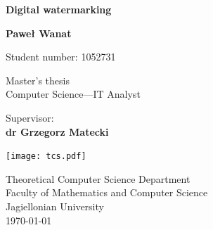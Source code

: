 \documentclass[a4paper,12pt]{article}
\title{}
\author{}
\begin{document}
\begin{titlepage}
    \begin{center}
        \vspace*{1cm}
        
        \Huge
        \textbf{Digital watermarking}
        
        \vspace{0.5cm}
        \LARGE
        
        \vspace{1.5cm}
        
        \textbf{Paweł Wanat}
        
        \vspace{0.10cm}
        
        \large
        Student number: 1052731
        
        \vfill
        
        \large
        
        Master's thesis \\
        Computer Science---IT Analyst
        
        \vfill	
        
        Supervisor: \\
        \textbf{dr Grzegorz Matecki}
        
        \vspace{0.8cm}
        
        \texttt{[image: tcs.pdf]}
        
        Theoretical Computer Science Department\\
        Faculty of Mathematics and Computer Science\\
        Jagiellonian University\\
        \monthyeardate\today
        
    \end{center}
\end{titlepage}

\newpage
\end{document}
